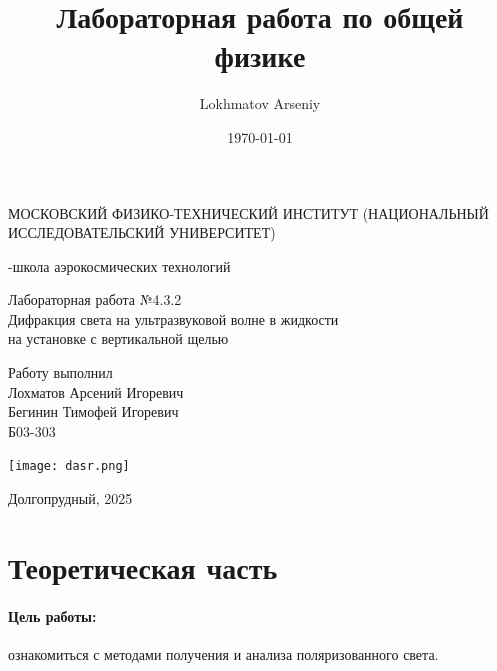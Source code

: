 \documentclass[a4paper,12pt]{article} %
\author{Lokhmatov Arseniy}
\title{Лабораторная работа по общей физике}
\date{\today}
\begin{document}
\begin{titlepage}
    \newpage
    \begin{center}
    {\large МОСКОВСКИЙ ФИЗИКО-ТЕХНИЧЕСКИЙ ИНСТИТУТ (НАЦИОНАЛЬНЫЙ ИССЛЕДОВАТЕЛЬСКИЙ УНИВЕРСИТЕТ)}
    \vspace{1cm}

    {-школа аэрокосмических технологий}
    \vspace{6em}
    \end{center}
    
    \vspace{1.2em}

    \begin{center}
    \Large Лабораторная работа №4.3.2 \\
    Дифракция света на ультразвуковой волне в жидкости\\
    на установке с вертикальной щелью
    \linebreak
    \end{center}
    
    \vspace{11em}
    
    \begin{flushright}
                       {\large Работу выполнил\\
                       Лохматов Арсений Игоревич\\
                       Бегинин Тимофей Игоревич\\
                       Б03-303 }
    \end{flushright}

    \vspace{\fill}

    \begin{center}
        \texttt{[image: dasr.png]}
    \end{center}

    \begin{center}
    Долгопрудный, 2025
    \end{center}

    \end{titlepage}

\section{Теоретическая часть}

\paragraph{Цель работы:} ознакомиться с методами получения и анализа поляризованного света.
\end{document}
